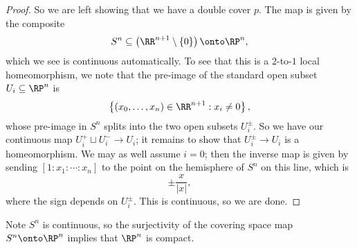 \documentclass[../notes.tex]{subfiles}
\begin{document}
\begin{proof}
	So we are left showing that we have a double cover $p$. The map is given by the composite
	\[S^n\subseteq\left(\RR^{n+1}\setminus\{0\}\right)\onto\RP^n,\]
	which we see is continuous automatically. To see that this is a $2$-to-$1$ local homeomorphism, we note that the pre-image of the standard open subset $U_i\subseteq\RP^n$ is
	\[\left\{(x_0,\ldots,x_n)\in\RR^{n+1}:x_i\ne0\right\},\]
	whose pre-image in $S^n$ splits into the two open subsets $U_i^\pm$. So we have our continuous map $U_i^+\sqcup U_i^-\to U_i$; it remains to show that $U_i^\pm\to U_i$ is a homeomorphism. We may as well assume $i=0$; then the inverse map is given by sending $[1:x_1:\cdots:x_n]$ to the point on the hemisphere of $S^n$ on this line, which is
	\[\pm\frac x{\left|x\right|},\]
	where the sign depends on $U_i^\pm$. This is continuous, so we are done.
\end{proof}
\begin{remark}
	Note $S^n$ is continuous, so the surjectivity of the covering space map $S^n\onto\RP^n$ implies that $\RP^n$ is compact.
\end{remark}
\end{document}

